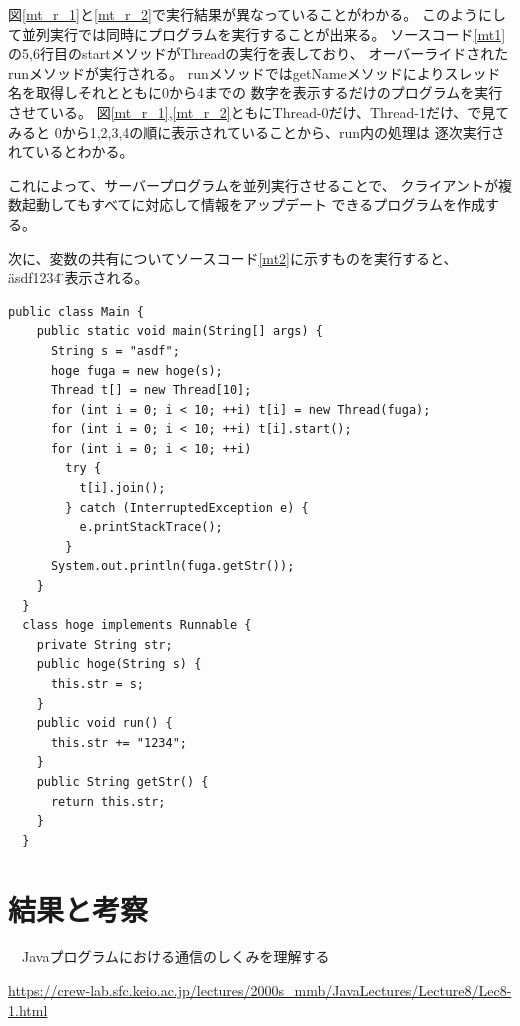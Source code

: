 \documentclass[dvipdfmx]{jsarticle}
\begin{document}
図\ref{mt_r_1}と\ref{mt_r_2}で実行結果が異なっていることがわかる。
このようにして並列実行では同時にプログラムを実行することが出来る。
ソースコード\ref{mt1}の5,6行目のstartメソッドがThreadの実行を表しており、
オーバーライドされたrunメソッドが実行される。
runメソッドではgetNameメソッドによりスレッド名を取得しそれとともに0から4までの
数字を表示するだけのプログラムを実行させている。
図\ref{mt_r_1},\ref{mt_r_2}ともにThread-0だけ、Thread-1だけ、で見てみると
0から1,2,3,4の順に表示されていることから、run内の処理は
逐次実行されているとわかる。

これによって、サーバープログラムを並列実行させることで、
クライアントが複数起動してもすべてに対応して情報をアップデート
できるプログラムを作成する。

次に、変数の共有についてソースコード\ref{mt2}に示すものを実行すると、
\"asdf1234\"と表示される。
\begin{lstlisting}[caption=マルチスレッドの例2,label=mt2]
  public class Main {
    public static void main(String[] args) {
      String s = "asdf";
      hoge fuga = new hoge(s);
      Thread t[] = new Thread[10];
      for (int i = 0; i < 10; ++i) t[i] = new Thread(fuga);
      for (int i = 0; i < 10; ++i) t[i].start();
      for (int i = 0; i < 10; ++i)
        try {
          t[i].join();
        } catch (InterruptedException e) {
          e.printStackTrace();
        }
      System.out.println(fuga.getStr());
    }
  }
  class hoge implements Runnable {
    private String str;
    public hoge(String s) {
      this.str = s;
    }
    public void run() {
      this.str += "1234";
    }
    public String getStr() {
      return this.str;
    }
  }
\end{lstlisting}

\section{結果と考察}

\begin{thebibliography}{10}
  　Javaプログラムにおける通信のしくみを理解する

  \url{https://crew-lab.sfc.keio.ac.jp/lectures/2000s_mmb/JavaLectures/Lecture8/Lec8-1.html}
\end{thebibliography}
\end{document}

